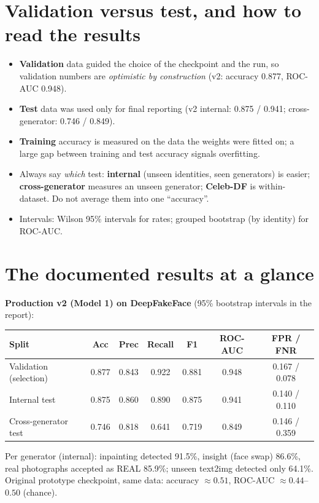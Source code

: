 \documentclass[11pt,a4paper]{report}
\begin{document}
\section{Validation versus test, and how to read the results}
\begin{itemize}
\item \textbf{Validation} data guided the choice of the checkpoint and the run, so validation numbers are \emph{optimistic by construction} (v2: accuracy 0.877, ROC-AUC 0.948).
\item \textbf{Test} data was used only for final reporting (v2 internal: 0.875 / 0.941; cross-generator: 0.746 / 0.849).
\item \textbf{Training} accuracy is measured on the data the weights were fitted on; a large gap between training and test accuracy signals overfitting.
\item Always say \emph{which} test: \textbf{internal} (unseen identities, seen generators) is easier; \textbf{cross-generator} measures an unseen generator; \textbf{Celeb-DF} is within-dataset. Do not average them into one ``accuracy''.
\item Intervals: Wilson 95\% intervals for rates; grouped bootstrap (by identity) for ROC-AUC.
\end{itemize}

\section{The documented results at a glance}
\textbf{Production v2 (Model 1) on DeepFakeFace} (95\% bootstrap intervals in the report):
\begin{center}
\small
\begin{tabular}{|l|c|c|c|c|c|c|}
\hline
\textbf{Split} & \textbf{Acc} & \textbf{Prec} & \textbf{Recall} & \textbf{F1} & \textbf{ROC-AUC} & \textbf{FPR / FNR}\\\hline
Validation (selection) & 0.877 & 0.843 & 0.922 & 0.881 & 0.948 & 0.167 / 0.078\\\hline
Internal test & 0.875 & 0.860 & 0.890 & 0.875 & 0.941 & 0.140 / 0.110\\\hline
Cross-generator test & 0.746 & 0.818 & 0.641 & 0.719 & 0.849 & 0.146 / 0.359\\\hline
\end{tabular}
\end{center}
Per generator (internal): inpainting detected 91.5\%, insight (face swap) 86.6\%, real photographs accepted as REAL 85.9\%; unseen text2img detected only 64.1\%.
Original prototype checkpoint, same data: accuracy $\approx0.51$, ROC-AUC $\approx0.44$--$0.50$ (chance).
\end{document}
